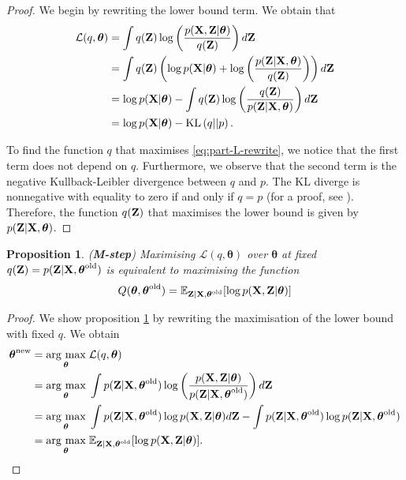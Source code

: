 \documentclass[11pt]{article}
\numberwithin{equation}{section}
\newcommand{\argmax}[1]{\underset{#1}{\operatorname{arg}\,\operatorname{max}}\;}
\newcommand{\KL}[2]{\text{KL}\left(#1 \vert\vert #2\right)}
\newcommand{\X}{{\bf X}}
\newcommand{\Z}{{\bf Z}}
\newtheorem{proposition}{Proposition}[section]
\begin{document}
\begin{proof}
	We begin by rewriting the lower bound term. We obtain that
	\begin{align}
		\mathcal{L}(q, \boldsymbol\theta) &= \int q(\Z)\log\left(\frac{p(\X, \Z \vert \boldsymbol\theta)}{q(\Z)}\right) d{\bf Z}\\
		&= \int q(\Z) \left(\log p(\X\vert\boldsymbol\theta) + \log\left( \frac{p(\Z \vert \X, \boldsymbol\theta)}{q(\Z)} \right) \right) d\Z\\
		&= \log p(\X \vert \boldsymbol{\theta}) - \int q(\Z) \log\left(\frac{q(\Z)}{p(\Z \vert \X, \boldsymbol\theta)}\right) d\Z\\
		&= \log p(\X \vert \boldsymbol\theta) - \KL{q}{p}. \label{eq:part-L-rewrite}
	\end{align}
	
	To find the function $q$ that maximises \eqref{eq:part-L-rewrite}, we notice that the first term does not depend on $q$. Furthermore, we observe that the second term is the negative Kullback-Leibler divergence between $q$ and $p$. The KL diverge is nonnegative with equality to zero if and only if $q=p$   (for a proof, see \cite{murphy2012}). Therefore, the function $q(\Z)$ that maximises the lower bound is given by $p(\Z \vert \X, \boldsymbol\theta)$.
\end{proof}

\begin{proposition}\label{prop:m-step}
	(\textbf{M-step}) Maximising $\mathcal{L}(q, \boldsymbol{\theta})$ over $\boldsymbol{\theta}$ at fixed $q({\bf Z}) = p({\bf Z} \vert {\bf X}, \boldsymbol\theta^\text{old})$ is equivalent to maximising the function
	\begin{equation}
		Q(\boldsymbol{\theta}, \boldsymbol{\theta}^\text{old}) = \mathbb{E}_{{\bf Z}\vert {\bf X}, \boldsymbol{\theta}^\text{old}}[\log p({\bf X}, {\bf Z}\vert \boldsymbol\theta)]
	\end{equation}
\end{proposition}

\begin{proof}
	We show proposition \ref{prop:m-step} by rewriting the maximisation of the lower bound with fixed $q$. We obtain
	\begin{align}
		\boldsymbol{\theta}^\text{new} &= \argmax{\boldsymbol\theta} \mathcal{L}(q, \boldsymbol\theta)\\
		&= \argmax{\boldsymbol{\theta}} \int p(\Z \vert \X, \boldsymbol{\theta}^\text{old}) \log\left(\frac{p(\X, \Z \vert \boldsymbol\theta)}{p(\Z \vert \X, \boldsymbol\theta^\text{old})}\right) d\Z\\
		&= \argmax{\boldsymbol{\theta}} \int p(\Z \vert \X, \boldsymbol{\theta} ^\text{old}) \log p(\X, \Z \vert \boldsymbol\theta) d\Z - \int p(\Z \vert \X, \boldsymbol{\theta}^\text{old}) \log p(\Z \vert \X, \boldsymbol{\theta}^\text{old})\\
		&= \argmax{\boldsymbol{\theta}} \mathbb{E}_{{\bf Z}\vert {\bf X}, \boldsymbol{\theta}^\text{old}}[\log p({\bf X}, {\bf Z}\vert \boldsymbol\theta)].
	\end{align}
\end{proof}
\end{document}
